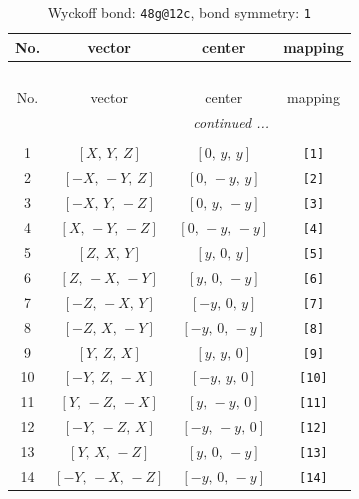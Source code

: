 \documentclass[fleqn,8pt]{jsarticle}
\begin{document}
\begin{longtable}{cccc}
\caption{Wyckoff bond: {\tt 48g@12c}, bond symmetry: {\tt 1}}
 \\
 \hline \hline
No. & vector & center & mapping \\ \hline \endfirsthead

\multicolumn{3}{l}{\tablename\ \thetable{}} \\
 \hline \hline
No. & vector & center & mapping \\ \hline \endhead

 \hline \hline
\multicolumn{3}{r}{\footnotesize\it continued ...} \\ \endfoot

 \hline \hline
\multicolumn{3}{r}{} \\ \endlastfoot

1 & $\left[ X,\, Y,\, Z \right]$ & $\left[ 0,\, y,\, y \right]$ & {\tt [1]} \\ \hline
2 & $\left[ - X,\, - Y,\, Z \right]$ & $\left[ 0,\, - y,\, y \right]$ & {\tt [2]} \\ \hline
3 & $\left[ - X,\, Y,\, - Z \right]$ & $\left[ 0,\, y,\, - y \right]$ & {\tt [3]} \\ \hline
4 & $\left[ X,\, - Y,\, - Z \right]$ & $\left[ 0,\, - y,\, - y \right]$ & {\tt [4]} \\ \hline
5 & $\left[ Z,\, X,\, Y \right]$ & $\left[ y,\, 0,\, y \right]$ & {\tt [5]} \\ \hline
6 & $\left[ Z,\, - X,\, - Y \right]$ & $\left[ y,\, 0,\, - y \right]$ & {\tt [6]} \\ \hline
7 & $\left[ - Z,\, - X,\, Y \right]$ & $\left[ - y,\, 0,\, y \right]$ & {\tt [7]} \\ \hline
8 & $\left[ - Z,\, X,\, - Y \right]$ & $\left[ - y,\, 0,\, - y \right]$ & {\tt [8]} \\ \hline
9 & $\left[ Y,\, Z,\, X \right]$ & $\left[ y,\, y,\, 0 \right]$ & {\tt [9]} \\ \hline
10 & $\left[ - Y,\, Z,\, - X \right]$ & $\left[ - y,\, y,\, 0 \right]$ & {\tt [10]} \\ \hline
11 & $\left[ Y,\, - Z,\, - X \right]$ & $\left[ y,\, - y,\, 0 \right]$ & {\tt [11]} \\ \hline
12 & $\left[ - Y,\, - Z,\, X \right]$ & $\left[ - y,\, - y,\, 0 \right]$ & {\tt [12]} \\ \hline
13 & $\left[ Y,\, X,\, - Z \right]$ & $\left[ y,\, 0,\, - y \right]$ & {\tt [13]} \\ \hline
14 & $\left[ - Y,\, - X,\, - Z \right]$ & $\left[ - y,\, 0,\, - y \right]$ & {\tt [14]} \\ \hline

\end{longtable}
\end{document}
